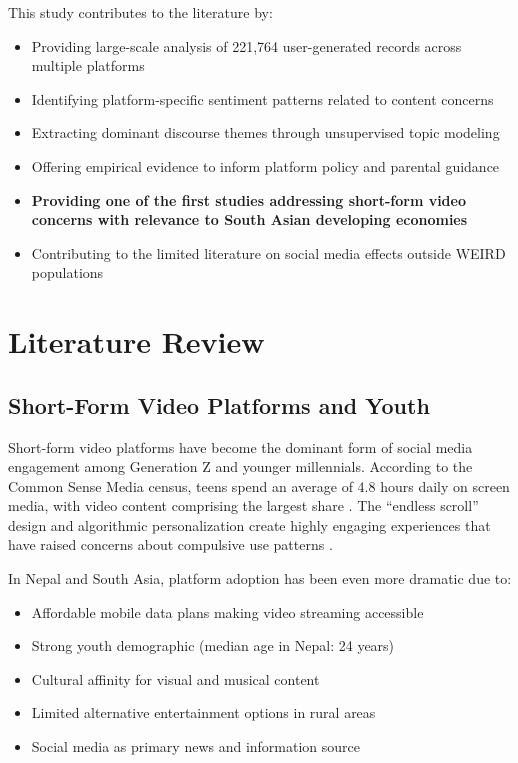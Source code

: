 \documentclass[11pt,a4paper]{article}
\begin{document}
This study contributes to the literature by:
\begin{itemize}[leftmargin=*, itemsep=0.3em]
    \item Providing large-scale analysis of 221,764 user-generated records across multiple platforms
    \item Identifying platform-specific sentiment patterns related to content concerns
    \item Extracting dominant discourse themes through unsupervised topic modeling
    \item Offering empirical evidence to inform platform policy and parental guidance
    \item \textbf{Providing one of the first studies addressing short-form video concerns with relevance to South Asian developing economies}
    \item Contributing to the limited literature on social media effects outside WEIRD populations
\end{itemize}

\section{Literature Review}

\subsection{Short-Form Video Platforms and Youth}

Short-form video platforms have become the dominant form of social media engagement among Generation Z and younger millennials. According to the Common Sense Media census, teens spend an average of 4.8 hours daily on screen media, with video content comprising the largest share \citep{rideout2022common}. The ``endless scroll'' design and algorithmic personalization create highly engaging experiences that have raised concerns about compulsive use patterns \citep{alter2017irresistible}.

In Nepal and South Asia, platform adoption has been even more dramatic due to:
\begin{itemize}[itemsep=0.2em]
    \item Affordable mobile data plans making video streaming accessible
    \item Strong youth demographic (median age in Nepal: 24 years)
    \item Cultural affinity for visual and musical content
    \item Limited alternative entertainment options in rural areas
    \item Social media as primary news and information source
\end{itemize}
\end{document}
